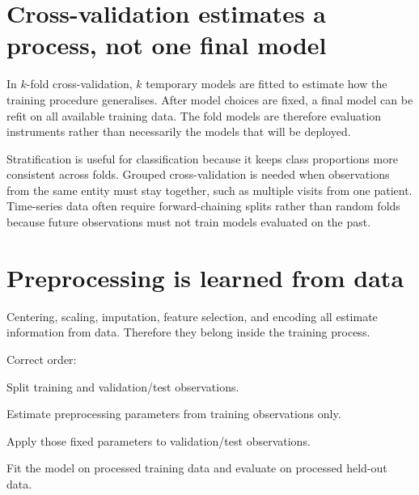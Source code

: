 \section{Cross-validation estimates a process, not one final model}
In $k$-fold cross-validation, $k$ temporary models are fitted to estimate how the training procedure generalises. After model choices are fixed, a final model can be refit on all available training data. The fold models are therefore evaluation instruments rather than necessarily the models that will be deployed.

Stratification is useful for classification because it keeps class proportions more consistent across folds. Grouped cross-validation is needed when observations from the same entity must stay together, such as multiple visits from one patient. Time-series data often require forward-chaining splits rather than random folds because future observations must not train models evaluated on the past.


\section{Preprocessing is learned from data}
Centering, scaling, imputation, feature selection, and encoding all estimate information from data. Therefore they belong inside the training process.

Correct order:
\begin{mlsteps}
  \item Split training and validation/test observations.
  \item Estimate preprocessing parameters from training observations only.
  \item Apply those fixed parameters to validation/test observations.
  \item Fit the model on processed training data and evaluate on processed held-out data.
\end{mlsteps}


